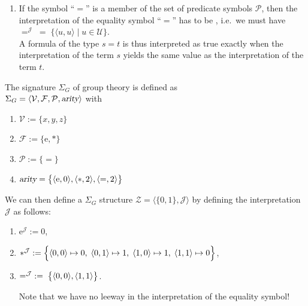 \begin{Definition}[Structure]
\begin{enumerate}
\begin{enumerate}
              The idea is that an atomic formula of the form $p(t_1, \cdots, t_n)$
              is interpreted as $\texttt{true}$ exactly if the interpretation of the tuple
              $\langle t_1, \cdots, t_n \rangle$ is an element of the set $p^\mathcal{J}$.
        \item If the symbol ``$=$'' is a member of the set of predicate symbols $\mathcal{P}$, then the
              interpretation of  the equality symbol ``$=$'' has to be , i.e.~we must have
              \\[0.2cm]
              \hspace*{1.3cm}  
              $=^\mathcal{J} \;=\; \bigl\{ \langle u, u \rangle \mid u \in \mathcal{U} \bigr\}$.
              \\[0.2cm]
              A formula of the type $s = t$ is thus interpreted as true 
              exactly when the interpretation of the term $s$ yields the same value as the interpretation of
              the term $t$. 
              \eox
        \end{enumerate}
    \end{enumerate}
\end{Definition}

\exampleEng
The signature $\Sigma_G$ of group theory is defined as \\[0.2cm]
\hspace*{1.3cm} $\Sigma_G = \langle \mathcal{V}, \mathcal{F}, \mathcal{P},\textsl{arity}\rangle$ 
\quad with
\begin{enumerate}
\item $\mathcal{V} := \{ x, y, z \}$
\item $\mathcal{F} := \{ \mathrm{e}, * \}$
\item $\mathcal{P} := \{ \mathtt{=} \}$
\item $\textsl{arity} = \bigl\{ \pair(\mathrm{e},0), \pair(*,2), \pair(\mathtt{=},2)\bigr\}$
\end{enumerate}
We can then define a $\Sigma_G$ structure $\mathcal{Z} = \langle \{0,1\},\mathcal{J}\rangle$ 
by defining the interpretation $\mathcal{J}$ 
as follows:
\begin{enumerate}
\item $\mathrm{e}^\mathcal{J} := 0$,
\item $*^\mathcal{J} := \Bigl\{ \pair(0,0) \mapsto 0,\;
                                 \pair(0,1) \mapsto 1,\;
                                 \pair(1,0) \mapsto 1,\;
                                 \pair(1,1) \mapsto 0 \Bigr\}$,
\item $=^\mathcal{J} \;:=\; \bigl\{ \pair(0,0), \pair(1,1) \bigr\}$.
                                 
      Note that we have no leeway in the interpretation of the equality symbol! \eox
\end{enumerate}

